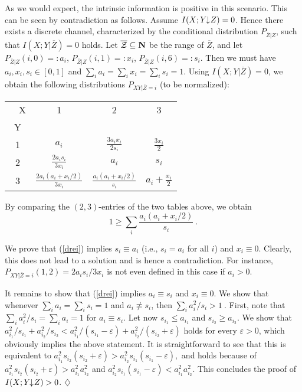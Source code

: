 \documentclass{article}
\newcommand{\exend}{\hspace*{\fill} $\diamondsuit$}
\newcommand{\ep}{\varepsilon}
\newcommand{\OZ}{\overline{Z}}
\newcommand{\CZ}{{\cal Z}}
\newcommand{\ida}{I(X;Y\hspace{-1.3mm}\downarrow\hspace{-0.8mm} Z)}
\begin{document}
As we would expect, the  intrinsic information is positive 
in this scenario. This can be seen by contradiction as follows. 
Assume $\ida=0$. Hence there exists a discrete channel, characterized
by the conditional distribution $P_{\OZ|Z}$, such that $I(X;Y|\OZ)=0$ holds.
Let $\overline{\CZ}\subseteq {\bf N}$
be the range of $\overline{Z}$, and let
$
P_{\OZ|Z}(i,0)  =:  a_i$,
$P_{\OZ|Z}(i,1)  =:  x_i$,
$P_{\OZ|Z}(i,6)  =:  s_i$.
Then we must have 
$a_i,x_i,s_i\in [0,1]$ and 
$\sum_i{a_i}=\sum_i{x_i}=\sum_i{s_i}=1$.
Using  $I(X;Y|\OZ)=0$, we obtain the following distributions 
$P_{XY|\OZ=i}$ (to be normalized):
\\
\begin{center}
\begin{tabular}{|c||c|c|c|}
\hline
\ \ X & 1 & 2 & 3\\
Y  &&&\\
\hline\hline
1 & $a_i$ & $\frac{3a_ix_i}{2s_i}$ & $\frac{3x_i}{2}$\\
\hline
2 & $\frac{2a_is_i}{3x_i}$ & $a_i$ & $s_i$\\
\hline
3 & $\frac{2a_i(a_i+x_i/2)}{3x_i}$ & $\frac{a_i(a_i+x_i/2)}{s_i}$ & 
$a_i+\frac{x_i}{2}$\\
\hline
\end{tabular}
\end{center}
By comparing the $(2,3)$-entries of the two tables above, we obtain
\begin{equation}\label{drei}
1\geq\sum_i{\frac{a_i(a_i+x_i/2)}{s_i}}\ .
\end{equation}

We  prove that  (\ref{drei}) 
implies $s_i\equiv a_i$ (i.e., $s_i =a_i$ for all $i$) and $x_i\equiv 0$. 
Clearly, this 
does not lead to a solution and is hence
a 
contradiction. For instance,
$
P_{XY|\OZ=i}(1,2)=2a_is_i/3x_i
$
is not even defined in this case if $a_i>0$.

It remains to show that  (\ref{drei})
implies $a_i\equiv s_i$ and $x_i\equiv 0$. We show that 
whenever $\sum_i{a_i}=\sum_i{s_i}=1$ and $a_i\not\equiv s_i$, then
$
\sum_i{a_i^2/s_i}>1\ .
$
First, note that $\sum_i{a_i^2/s_i}=\sum_i{a_i}=1$ for $a_i\equiv s_i$.
Let now $s_{i_1}\leq a_{i_1}$ and $s_{i_2}\geq a_{i_2}$. We show that 
$
a_{i_1}^2/s_{i_1}+a_{i_2}^2/s_{i_2}<a_{i_1}^2/(s_{i_1}-\ep)+a_{i_2}^2/(s_{i_2}+\ep)
$
holds for every $\ep>0$,
which obviously  implies  the above statement. It is  straightforward 
to see that this
 is equivalent to
$
a_{i_1}^2s_{i_2}(s_{i_2}+\ep)>a_{i_2}^2s_{i_1}(s_{i_1}-\ep),
$
and holds because of
$
a_{i_1}^2s_{i_2}(s_{i_2}+\ep)>a_{i_1}^2a_{i_2}^2$ and 
$
a_{i_2}^2s_{i_1}(s_{i_1}-\ep)<a_{i_1}^2a_{i_2}^2
$.
This concludes the proof of  $\ida>0$.
\exend
\ \\
\end{document}
